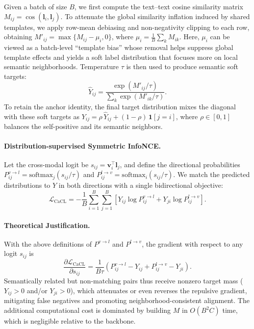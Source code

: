 \documentclass{article} %
\begin{document}
Given a batch of size $B$, we first compute the text–text cosine similarity matrix $M_{ij}=\cos(\mathbf l_i,\mathbf l_j)$. To attenuate the global similarity inflation induced by shared templates, we apply row-mean debiasing and non-negativity clipping to each row, obtaining $M'_{ij}=\max\{M_{ij}-\mu_i,0\}$, where $\mu_i=\tfrac{1}{B}\sum_{k}M_{ik}$. Here, $\mu_i$ can be viewed as a batch-level “template bias” whose removal helps suppress global template effects and yields a soft label distribution that focuses more on local semantic neighborhoods. Temperature $\tau$ is then used to produce semantic soft targets:
\begin{equation}
\hat{Y}_{ij}=\frac{\exp(M'_{ij}/\tau)}{\sum_{k}\exp(M'_{ik}/\tau)}.
\end{equation}
To retain the anchor identity, the final target distribution mixes the diagonal with these soft targets as $Y_{ij}=\rho\,\hat{Y}_{ij}+(1-\rho)\,\mathbf{1}[j=i]$, where $\rho\in[0,1]$ balances the self-positive and its semantic neighbors.

\paragraph{Distribution-supervised Symmetric InfoNCE.}

Let the cross-modal logit be $s_{ij}=\mathbf v_i^\top \mathbf l_j$, and define the directional probabilities $P^{v\to l}_{ij}=\mathrm{softmax}_j(s_{ij}/\tau)$ and $P^{l\to v}_{ij}=\mathrm{softmax}_i(s_{ij}/\tau)$. We match the predicted distributions to $Y$ in both directions with a single bidirectional objective:
\begin{equation}
\mathcal{L}_{\mathrm{CaCL}}
=-\frac{1}{B}\sum_{i=1}^{B}\sum_{j=1}^{B}\!\left[
Y_{ij}\log P^{v\to l}_{ij}
+Y_{ji}\log P^{l\to v}_{ij}
\right].
\end{equation}

\paragraph{Theoretical Justification.}

With the above definitions of $P^{v\to l}$ and $P^{l\to v}$, the gradient with respect to any logit $s_{ij}$ is
\begin{equation}
\frac{\partial \mathcal{L}_{\mathrm{CaCL}}}{\partial s_{ij}}
=
\frac{1}{B\tau}
\left(
P^{v\to l}_{ij}-Y_{ij}
+
P^{l\to v}_{ij}-Y_{ji}
\right).
\end{equation}
Semantically related but non-matching pairs thus receive nonzero target mass ($Y_{ij}>0$ and/or $Y_{ji}>0$), which attenuates or even reverses the repulsive gradient, mitigating false negatives and promoting neighborhood-consistent alignment. The additional computational cost is dominated by building $M$ in $O(B^2 C)$ time, which is negligible relative to the backbone.
\end{document}
